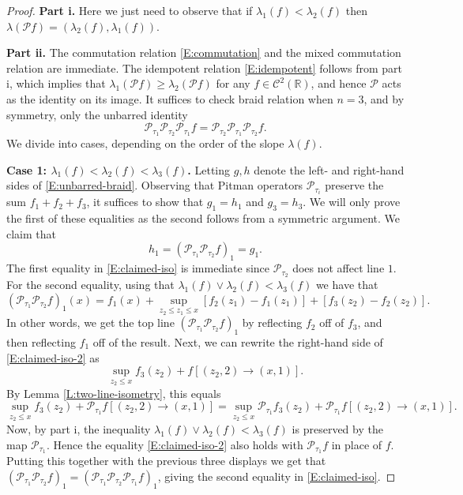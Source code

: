 \documentclass[11pt]{article}
\newcommand{\R}{\mathbb{R}}
\newcommand{\la}{\lambda}
\newcommand{\cC}{\mathcal{C}}
\newcommand{\cP}{\mathcal{P}}
\theoremstyle{definition} %
\theoremstyle{remark} %
\begin{document}
\begin{proof}
\textbf{Part i.} \qquad Here we just need to observe that if $\la_1(f) < \la_2(f)$ then $\la(\cP f) = (\la_2 (f), \la_1 (f))$.	
	
\textbf{Part ii.} \qquad The commutation relation \eqref{E:commutation} and the mixed commutation relation are immediate. The idempotent relation \eqref{E:idempotent} follows from part i, which implies that $\la_1(\cP f) \ge \la_2(\cP f)$ for any $f \in \cC^2(\R)$, and hence $\cP$ acts as the identity on its image. It suffices to check braid relation when $n = 3$, and by symmetry, only the unbarred identity
\begin{equation}
\label{E:unbarred-braid}
\cP_{\tau_1} \cP_{\tau_2} \cP_{\tau_1} f = \cP_{\tau_2} \cP_{\tau_1} \cP_{\tau_2} f.
\end{equation}
 We divide into cases, depending on the order of the slope $\la(f)$.
 
 \textbf{Case 1: $\la_1(f) < \la_2(f) < \la_3(f)$.} \qquad Letting $g, h$ denote the left- and right-hand sides of \eqref{E:unbarred-braid}. Observing that Pitman operators $\cP_{\tau_i}$ preserve the sum $f_1 + f_2 + f_3$, it suffices to show that $g_1 = h_1$ and $g_3 = h_3$. We will only prove the first of these equalities as the second follows from a symmetric argument. We claim that 
 \begin{equation}
 \label{E:claimed-iso}
 h_1 = (\cP_{\tau_1} \cP_{\tau_2} f)_1 = g_1.
 \end{equation}
 The first equality in \eqref{E:claimed-iso} is immediate since $\cP_{\tau_2}$ does not affect line $1$. For the second equality, using that $\la_1(f) \vee \la_2(f) < \la_3(f)$ we have that 
  \begin{equation}
 \label{E:claimed-iso-2}
(\cP_{\tau_1} \cP_{\tau_2} f)_1(x) = f_1(x) + \sup_{z_2 \le z_1 \le x} [f_2(z_1) - f_1(z_1)] + [f_3(z_2) - f_2(z_2)].
 \end{equation}
 In other words, we get the top line $(\cP_{\tau_1} \cP_{\tau_2} f)_1$ by reflecting $f_2$ off of $f_3$, and then reflecting $f_1$ off of the result. Next, we can rewrite the right-hand side of \eqref{E:claimed-iso-2} as
 $$
 \sup_{z_2 \le x} f_3(z_2) + f[(z_2, 2) \to (x, 1)].
 $$
 By Lemma \ref{L:two-line-isometry}, this equals 
 $$
 \sup_{z_2 \le x} f_3(z_2) + \cP_{\tau_1} f[(z_2, 2) \to (x, 1)] =\sup_{z_2 \le x} \cP_{\tau_1} f_3(z_2) + \cP_{\tau_1} f[(z_2, 2) \to (x, 1)].
 $$
 Now, by part i, the inequality $\la_1(f) \vee \la_2(f) < \la_3(f)$ is preserved by the map $\cP_{\tau_1}$. Hence the equality \eqref{E:claimed-iso-2} also holds with $\cP_{\tau_1} f$ in place of $f$. Putting this together with the previous three displays we get that $(\cP_{\tau_1} \cP_{\tau_2} f)_1 = (\cP_{\tau_1} \cP_{\tau_2} \cP_{\tau_1} f)_1$, giving the second equality in \eqref{E:claimed-iso}.
 

\end{proof}
\end{document}
